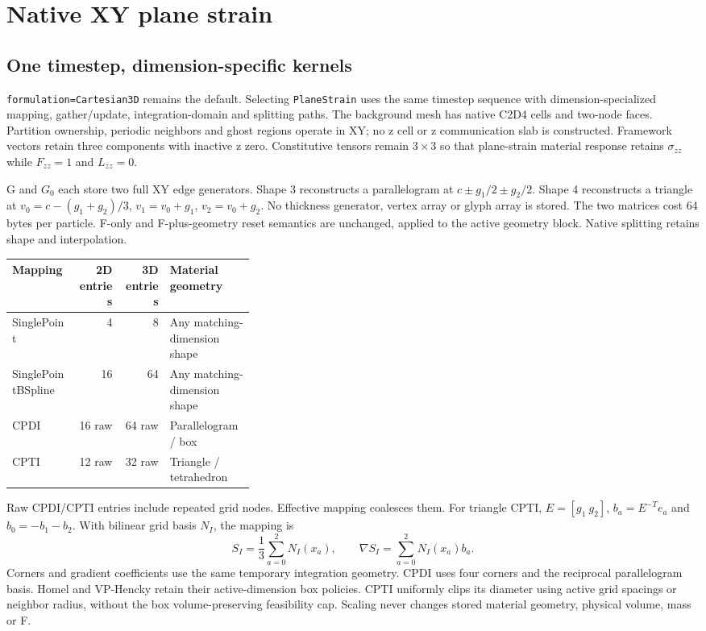 \section{Native XY plane strain}
\label{sec:native-true-2d}

\subsection{One timestep, dimension-specific kernels}
\texttt{formulation=Cartesian3D} remains the default. Selecting
\texttt{PlaneStrain} uses the same timestep sequence with dimension-specialized
mapping, gather/update, integration-domain and splitting paths. The background
mesh has native C2D4 cells and two-node faces. Partition ownership, periodic
neighbors and ghost regions operate in XY; no z cell or z communication slab
is constructed. Framework vectors retain three components with inactive z zero.
Constitutive tensors remain $3\times3$ so that plane-strain material response
retains $\sigma_{zz}$ while $F_{zz}=1$ and $L_{zz}=0$.

G and $G_0$ each store two full XY edge generators. Shape 3 reconstructs a
parallelogram at $c\pm g_1/2\pm g_2/2$. Shape 4 reconstructs a triangle at
$v_0=c-(g_1+g_2)/3$, $v_1=v_0+g_1$, $v_2=v_0+g_2$. No thickness generator,
vertex array or glyph array is stored. The two matrices cost 64 bytes per
particle. F-only and F-plus-geometry reset semantics are unchanged, applied
to the active geometry block. Native splitting retains shape and interpolation.

\begin{center}\small
\begin{tabular}{@{}lrrp{0.35\linewidth}@{}}
\toprule Mapping & 2D entries & 3D entries & Material geometry\\\midrule
SinglePoint & 4 & 8 & Any matching-dimension shape\\
SinglePointBSpline & 16 & 64 & Any matching-dimension shape\\
CPDI & 16 raw & 64 raw & Parallelogram / box\\
CPTI & 12 raw & 32 raw & Triangle / tetrahedron\\
\bottomrule
\end{tabular}\end{center}
Raw CPDI/CPTI entries include repeated grid nodes. Effective mapping coalesces
them. For triangle CPTI, $E=[g_1\ g_2]$, $b_a=E^{-T}e_a$ and
$b_0=-b_1-b_2$. With bilinear grid basis $N_I$, the mapping is
\[
 S_I=\frac{1}{3}\sum_{a=0}^{2}N_I(x_a),\qquad
 \nabla S_I=\sum_{a=0}^{2}N_I(x_a)b_a.
\]
Corners and gradient coefficients use the same temporary integration geometry.
CPDI uses four corners and the reciprocal parallelogram basis. Homel and
VP-Hencky retain their active-dimension box policies. CPTI uniformly clips
its diameter using active grid spacings or neighbor radius, without the box
volume-preserving feasibility cap. Scaling never changes stored material
geometry, physical volume, mass or F.

